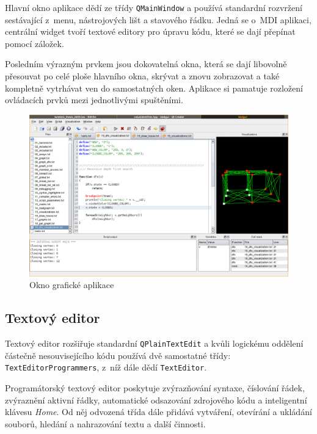 \documentclass[11pt,twoside,a4paper]{book}
\begin{document}
Hlavní okno aplikace dědí ze třídy \texttt{QMainWindow} a používá standardní rozvržení sestávající z~menu, nástrojových lišt a stavového řádku. Jedná se o~MDI aplikaci, centrální widget tvoří textové editory pro úpravu kódu, které se dají přepínat pomocí záložek.

Posledním výrazným prvkem jsou dokovatelná okna, která se dají libovolně přesouvat po celé ploše hlavního okna, skrývat a znovu zobrazovat a také kompletně vytrhávat ven do samostatných oken. Aplikace si pamatuje rozložení ovládacích prvků mezi jednotlivými spuštěními.

\begin{figure}[ht]
\begin{center}
\includegraphics[width=\textwidth]{img/screenshot.png}
\caption{Okno grafické aplikace}
\label{fig:main_window}
\end{center}
\end{figure}


\subsection{Textový editor}

Textový editor rozšiřuje standardní \texttt{QPlainTextEdit} a kvůli logickému oddělení částečně nesouvisejícího kódu používá dvě samostatné třídy: \texttt{TextEditorProgrammers}, z~níž dále dědí \texttt{TextEditor}.

Programátorský textový editor poskytuje zvýrazňování syntaxe, číslování řádek, zvýraznění aktivní řádky, automatické odsazování zdrojového kódu a inteligentní klávesu \textit{Home}. Od něj odvozená třída dále přidává vytváření, otevírání a ukládání souborů, hledání a nahrazování textu a další činnosti.
\end{document}
